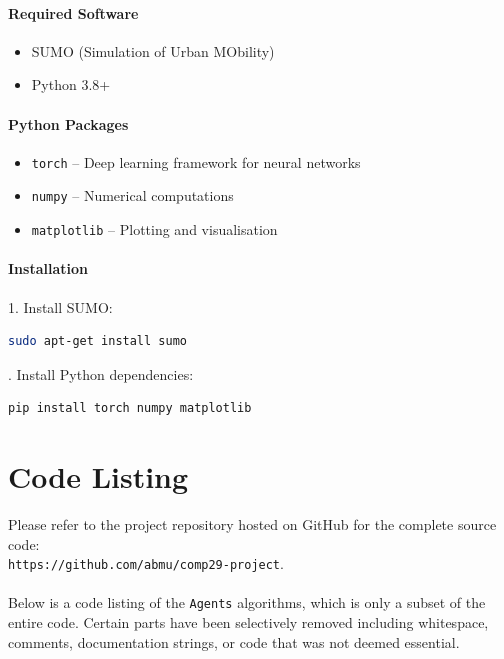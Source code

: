 \documentclass[a4paper]{report}
\begin{document}
\subsubsection{Required Software}
\begin{itemize}
    \item SUMO (Simulation of Urban MObility)
    \item Python 3.8+
\end{itemize}

\subsubsection{Python Packages}
\begin{itemize}
    \item \texttt{torch} -- Deep learning framework for neural networks
    \item \texttt{numpy} -- Numerical computations
    \item \texttt{matplotlib} -- Plotting and visualisation
\end{itemize}

\subsubsection{Installation}

1. Install SUMO:

\begin{lstlisting}[language=bash]
   sudo apt-get install sumo
\end{lstlisting}

. Install Python dependencies:

\begin{lstlisting}[language=bash]
   pip install torch numpy matplotlib
\end{lstlisting}

\chapter{Code Listing} \label{appendix_code_listing}

Please refer to the project repository hosted on GitHub for the complete source code:\\\texttt{https://github.com/abmu/comp29-project}.
\\ \\
Below is a code listing of the \texttt{Agents} algorithms, which is only a subset of the entire code. Certain parts have been selectively removed including whitespace, comments, documentation strings, or code that was not deemed essential.
\end{document}
